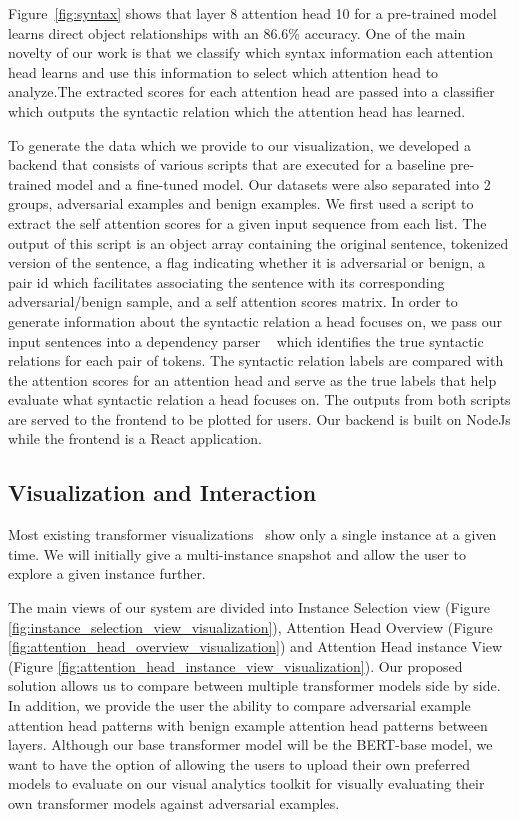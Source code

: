 \documentclass[journal]{vgtc}                %
\begin{document}
Figure~\ref{fig:syntax} shows that layer 8 attention head 10 for a pre-trained model learns direct object relationships with an 86.6\% accuracy. One of the main novelty of our work is that we classify which syntax information each attention head learns and use this information to select which attention head to analyze.The extracted scores for each attention head are passed into a classifier which outputs the syntactic relation which the attention head has learned. 

To generate the data which we provide to our visualization, we developed a backend that consists of various scripts that are executed for a baseline pre-trained model and a fine-tuned model. Our datasets were also separated into 2 groups, adversarial examples and benign examples. We first used a script to extract the self attention scores for a given input sequence from each list. The output of this script is an object array containing the original sentence, tokenized version of the sentence, a flag indicating whether it is adversarial or benign, a pair id which facilitates associating the sentence with its corresponding adversarial/benign sample, and a self attention scores matrix. In order to generate information about the syntactic relation a head focuses on, we pass our input sentences into a dependency parser ~\cite{lalparser} which identifies the true syntactic relations for each pair of tokens. The syntactic relation labels are compared with the attention scores for an attention head and serve as the true labels that help evaluate what syntactic relation a head focuses on. The outputs from both scripts are served to the frontend to be plotted for users. Our backend is built on NodeJs while the frontend is a React application.


\subsection{Visualization and Interaction}
Most existing transformer visualizations~\cite{vig-2019-multiscale, aken2020visbert, vskrlj2020attviz, kobayashi-etal-2020-attention} show only a single instance at a given time. We will initially give a multi-instance snapshot and allow the user to explore a given instance further.  

The main views of our system are divided into Instance Selection view (Figure \ref{fig:instance_selection_view_visualization}), Attention Head Overview (Figure \ref{fig:attention_head_overview_visualization}) and Attention Head instance View (Figure \ref{fig:attention_head_instance_view_visualization}). Our proposed solution allows us to compare between multiple transformer models side by side.  In addition, we provide the user the ability to compare adversarial example attention head patterns with benign example attention head patterns between layers. Although our base transformer model will be the BERT-base model, we want to have the option of allowing the users to upload their own preferred models to evaluate on our visual analytics toolkit for visually evaluating their own transformer models against adversarial examples.  
\end{document}
